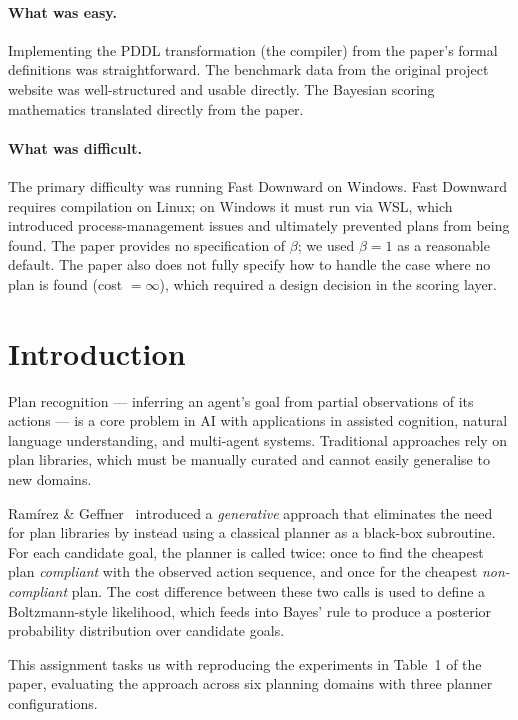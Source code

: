 \documentclass[10pt,twocolumn]{article}
\begin{document}
\paragraph{What was easy.}
Implementing the PDDL transformation (the compiler) from the paper's formal definitions was straightforward. The benchmark data from the original project website was well-structured and usable directly. The Bayesian scoring mathematics translated directly from the paper.

\paragraph{What was difficult.}
The primary difficulty was running Fast Downward on Windows. Fast Downward requires compilation on Linux; on Windows it must run via WSL, which introduced process-management issues and ultimately prevented plans from being found. The paper provides no specification of $\beta$; we used $\beta = 1$ as a reasonable default. The paper also does not fully specify how to handle the case where no plan is found (cost $= \infty$), which required a design decision in the scoring layer.

\section{Introduction}

Plan recognition — inferring an agent's goal from partial observations of its actions — is a core problem in AI with applications in assisted cognition, natural language understanding, and multi-agent systems. Traditional approaches rely on plan libraries, which must be manually curated and cannot easily generalise to new domains.

Ramírez \& Geffner~\cite{ramirez2010probabilistic} introduced a \emph{generative} approach that eliminates the need for plan libraries by instead using a classical planner as a black-box subroutine. For each candidate goal, the planner is called twice: once to find the cheapest plan \emph{compliant} with the observed action sequence, and once for the cheapest \emph{non-compliant} plan. The cost difference between these two calls is used to define a Boltzmann-style likelihood, which feeds into Bayes' rule to produce a posterior probability distribution over candidate goals.

This assignment tasks us with reproducing the experiments in Table~1 of the paper, evaluating the approach across six planning domains with three planner configurations.
\end{document}
